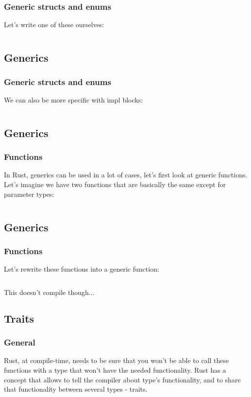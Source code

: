 \documentclass[usenames,twocolumn,dvipsnames,10pt,a4wide]{article}
\begin{document}
	\subsubsection{Generic structs and enums}
	Let's write one of these ourselves:
	\inputminted[fontsize=\normalsize]{rust}{code/generics2.rs}


\subsection{Generics}
	\subsubsection{Generic structs and enums}
	We can also be more specific with impl blocks:
	\inputminted[fontsize=\normalsize]{rust}{code/generics3.rs}


\subsection{Generics}
	\subsubsection{Functions}
	In Rust, generics can be used in a lot of cases,
	let's first look at generic functions.
	Let's imagine we have two functions that are
	basically the same except for parameter types:
	\inputminted[fontsize=\normalsize]{rust}{code/generics4.rs}


\subsection{Generics}
	\subsubsection{Functions}
	Let's rewrite these functions into a generic function:
	\inputminted[fontsize=\normalsize]{rust}{code/generics5.rs}
	This doesn't compile though...


\subsection{Traits}
	\subsubsection{General}
	Rust, at compile-time, needs to be sure that you
	won't be able to call these functions with a type
	that won't have the needed functionality.
	Rust has a concept that allows to tell the compiler
	about type's functionality, and to share that
	functionality between several types - traits.
	
\end{document}
